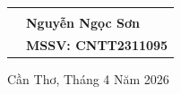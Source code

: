 \begin{titlepage}
\begin{center}
\begin{center}
\begin{tabular}{p{7.5cm}l}
            \vspace{0.2cm} & \\ %
            
            & \fontsize{14}{16}\selectfont \textbf{Nguyễn Ngọc Sơn} \\
            & \fontsize{14}{16}\selectfont \textbf{MSSV: CNTT2311095} \\
        \end{tabular}
    \end{center}

    \vfill
    {\fontsize{13}{15}\selectfont Cần Thơ, Tháng 4 Năm 2026 \par}
\end{center}
\end{titlepage}